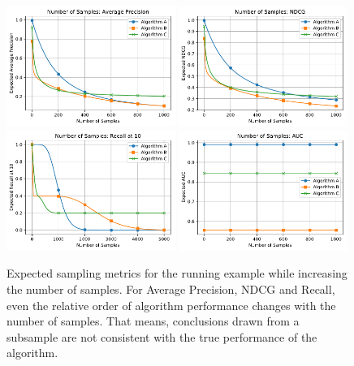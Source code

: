 \begin{figure}[ht]
    \centering
    \includegraphics[width=0.49\textwidth]{figures/ex_num_samples_vs_ap.pdf}
    \includegraphics[width=0.49\textwidth]{figures/ex_num_samples_vs_ndcg.pdf} \newline
    \includegraphics[width=0.49\textwidth]{figures/ex_num_samples_vs_recall.pdf}
    \includegraphics[width=0.49\textwidth]{figures/ex_num_samples_vs_auc.pdf}
    \caption{\footnotesize{Expected sampling metrics for the running example while increasing the number of samples.
    For Average Precision, NDCG and Recall, even the relative order of algorithm performance changes with the number of samples.
    That means, conclusions drawn from a subsample are not consistent with the true performance of the algorithm.}}
    \label{fig:example_vary_m}
\end{figure}

